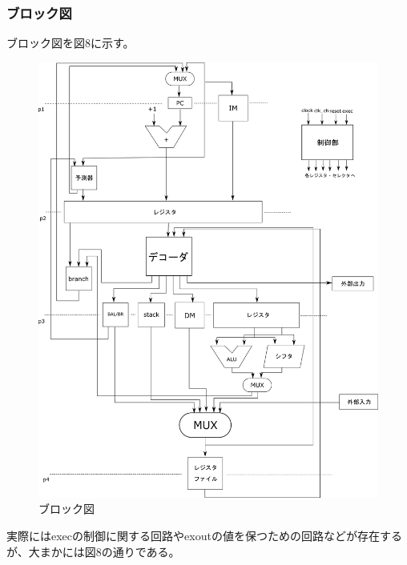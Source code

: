 \documentclass{jarticle}
\begin{document}
\subsubsection{ブロック図}
\hspace{10pt}ブロック図を図8に示す。
\begin{figure}[htbp]
  \centering
  \caption{ブロック図}
  \includegraphics[width=\hsize]{block.png}
\end{figure}
実際にはexecの制御に関する回路やexoutの値を保つための回路などが存在するが、大まかには図8の通りである。
\end{document}
